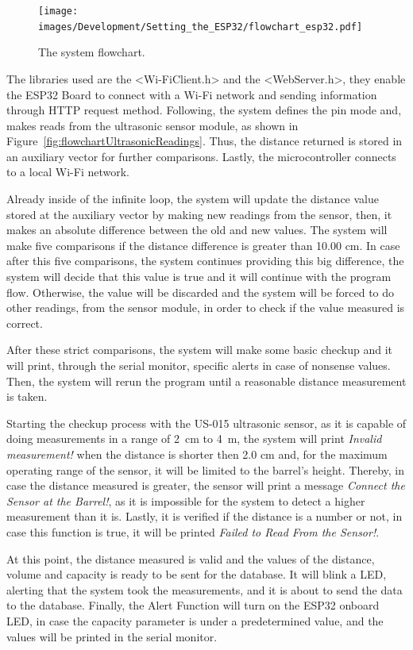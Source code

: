 \begin{figure}[h!]
    \centering
    \texttt{[image: images/Development/Setting\_the\_ESP32/flowchart\_esp32.pdf]}
    \caption{The system flowchart.}
    \label{fig:flowchart_esp32}
\end{figure}

The libraries used are the <Wi-FiClient.h> and the <WebServer.h>, they enable the ESP32 Board to connect with a Wi-Fi network and sending information through \gls{HTTP} request method. Following, the system defines the pin mode and, makes reads from the ultrasonic sensor module, as shown in Figure~\ref{fig:flowchartUltrasonicReadings}. Thus, the distance returned is stored in an auxiliary vector for further comparisons. Lastly, the microcontroller connects to a local Wi-Fi network.

Already inside of the infinite loop, the system will update the distance value stored at the auxiliary vector by making new readings from the sensor, then, it makes an absolute difference between the old and new values. The system will make five comparisons if the distance difference is greater than 10.00 cm. In case after this five comparisons, the system continues providing this big difference, the system will decide that this value is true and it will continue with the program flow. Otherwise, the value will be discarded and the system will be forced to do other readings, from the sensor module, in order to check if the value measured is correct.

After these strict comparisons, the system will make some basic checkup and it will print, through the serial monitor, specific alerts in case of nonsense values. Then, the system will rerun the program until a reasonable distance measurement is taken.

Starting the checkup process with the US-015 ultrasonic sensor, as it is capable of doing measurements in a range of 2~cm to 4~m, the system will print \textit{Invalid measurement!} when the distance is shorter then 2.0 cm and, for the maximum operating range of the sensor, it will be limited to the barrel's height. Thereby, in case the distance measured is greater, the sensor will print a message \textit{Connect the Sensor at the Barrel!}, as it is impossible for the system to detect a higher measurement than it is. Lastly, it is verified if the distance is a number or not, in case this function is true, it will be printed \textit{Failed to Read From the Sensor!}.

At this point, the distance measured is valid and the values of the distance, volume and capacity is ready to be sent for the database. It will blink a LED, alerting that the system took the measurements, and it is about to send the data to the database. Finally, the Alert Function will turn on the ESP32 onboard \gls{LED}, in case the capacity parameter is under a predetermined value, and the values will be printed in the serial monitor. 

